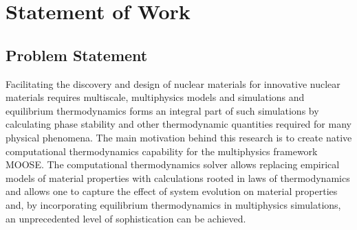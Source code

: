 \chapter{Statement of Work} \label{chap:overview}
	
\section{Problem Statement}
	Facilitating the discovery and design of nuclear materials for innovative nuclear materials requires multiscale, multiphysics models and simulations and equilibrium thermodynamics forms an integral part of such simulations by calculating phase stability and other thermodynamic quantities required for many physical phenomena. The main motivation behind this research is to create native computational thermodynamics capability for the multiphysics framework MOOSE. The computational thermodynamics solver allows replacing empirical models of material properties with calculations rooted in laws of thermodynamics and allows one to capture the effect of system evolution on material properties and, by incorporating equilibrium thermodynamics in multiphysics simulations, an unprecedented level of sophistication can be achieved.

